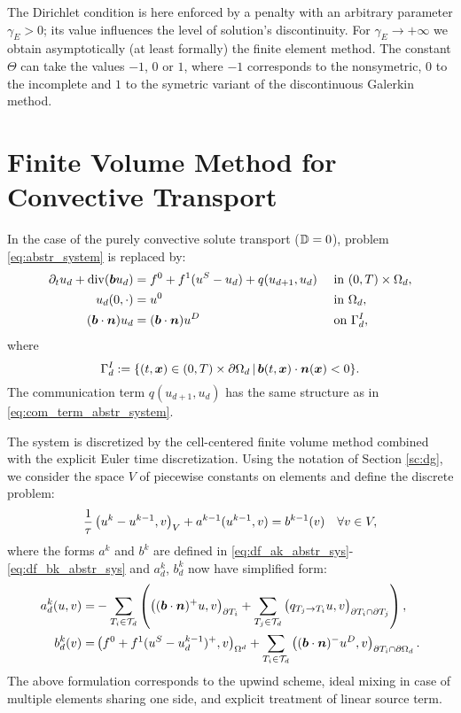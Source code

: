The Dirichlet condition is here enforced by a penalty with an arbitrary parameter $\gamma_E>0$;
 its value influences the level of solution's discontinuity.
For $\gamma_E\to+\infty$ we obtain asymptotically (at least formally) the finite element method.
The constant $\Theta$ can take the values $-1$, $0$ or $1$,
 where $-1$ corresponds to the nonsymetric, $0$ to the incomplete and $1$ to the symetric variant of the discontinuous Galerkin method.




\section{Finite Volume Method for Convective Transport}

In the case of the purely convective solute transport ($\tn D=0$), problem \eqref{eq:abstr_system} is replaced by:
\begin{subequations}
 \label{eq:abstr_system_conv}
 \begin{align}
  \partial_t u_d + \div(\vc b u_d) &= f^0+f^1(u^S-u_d) + q(u_{d+1},u_d) &&\mbox{ in }(0,T)\times\Omega_d,\\
  u_d(0,\cdot) &= u^0 &&\mbox{ in }\Omega_d,\\
  \label{eq:bc_abstr_neu} (\vc b\cdot\vc n) u_d &= (\vc b\cdot\vc n) u^D &&\mbox{ on }\Gamma_d^I,
 \end{align}
\end{subequations}
 where
 \[ \Gamma_d^I:=\{(t,\vc x)\in(0,T)\times\partial\Omega_d\where \vc b(t,\vc x)\cdot\vc n(\vc x)<0\}. \]
 The communication term $q(u_{d+1},u_d)$ has the same structure as in \eqref{eq:com_term_abstr_system}.

The system is discretized by the cell-centered finite volume method combined with the explicit Euler time discretization.
Using the notation of Section \ref{sc:dg}, we consider the space $V$ of piecewise constants on elements and define the discrete problem:
\begin{equation*}
 \frac1\tau\sc{u^{k}-u^{k-1}}{v}_{V} + a^{k-1}(u^{k-1},v) = b^{k-1}(v) \quad \forall v\in V,
\end{equation*}
where the forms $a^k$ and $b^k$ are defined in \eqref{eq:df_ak_abstr_sys}-\eqref{eq:df_bk_abstr_sys} and $a^k_d$, $b^k_d$ now have simplified form:
\begin{align*}
 a^{k}_d(u,v) = & -\sum_{T_i\in\Td}\left(\sc{(\vc b\cdot\vc n)^+u}{v}_{\partial T_i} + \sum_{T_j\in\Td}\sc{q_{T_j\to T_i}u}{v}_{\partial T_i\cap\partial T_j} \right),\\
 b^{k}_d(v) = &\sc{f^0+f^1(u^S-u^{k-1}_d)^+}{v}_{\Omega^d} + \sum_{T_i\in\Td}\sc{(\vc b\cdot\vc n)^-u^D}{v}_{\partial T_i\cap\partial\Omega_d}.
\end{align*}
The above formulation corresponds to the upwind scheme, ideal mixing in case of multiple elements sharing one side, and explicit treatment of linear source term.

% 
